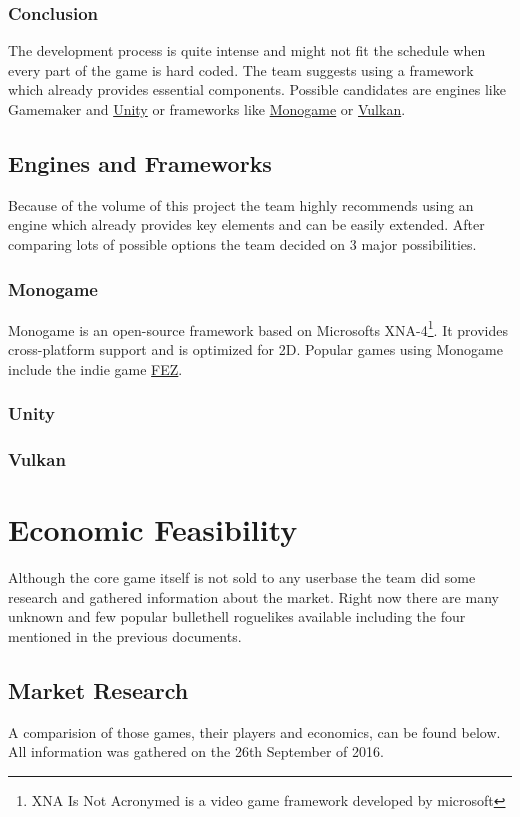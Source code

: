 \documentclass[11pt]{article}
\begin{document}
\subsubsection{Conclusion}
The development process is quite intense and might not fit the schedule when every part of the game is hard coded. The team suggests using a framework which already provides essential components.
Possible candidates are engines like Gamemaker and \hyperref[subsubsec:unity]{Unity} or frameworks like \hyperref[subsubsec:monogame]{Monogame} or \hyperref[subsubsec:vulkan]{Vulkan}.

\subsection{Engines and Frameworks}
Because of the volume of this project the team highly recommends using an engine which already provides key elements and can be easily extended.
After comparing lots of possible options the team decided on 3 major possibilities.

\subsubsection{Monogame}\label{subsubsec:monogame}
Monogame is an open-source framework based on Microsofts XNA-4\footnote{XNA Is Not Acronymed is a video game framework developed by microsoft}. It provides cross-platform support and is optimized for 2D.
Popular games using Monogame include the indie game \href{http://store.steampowered.com/app/224760/}{FEZ}.
\subsubsection{Unity}\label{subsubsec:unity}
\subsubsection{Vulkan}\label{subsubsec:vulkan}


\section{Economic Feasibility}
Although the core game itself is not sold to any userbase the team did some research and gathered information about the market.
Right now there are many unknown and few popular bullethell roguelikes available including the four mentioned in the previous documents.

\subsection{Market Research}
A comparision of those games, their players and economics, can be found below. All information was gathered on the 26th September of 2016.
\end{document}
